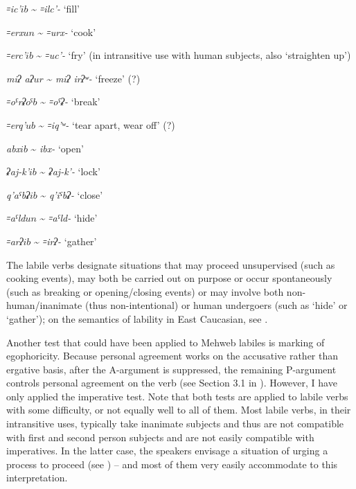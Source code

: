 \documentclass[output=paper]{langsci/langscibook}
\begin{document}
\ea %
\emph{꞊ic'\(ib\)} \textasciitilde{} \emph{꞊ilc'-} `fill'

\ex %
\emph{꞊erx\(un\)} \textasciitilde{} \emph{꞊urx-} `cook'

\ex %
\emph{꞊erc'\(ib\)} \textasciitilde{} \emph{꞊uc'-} `fry' (in
intransitive use with human subjects, also `straighten up')

\ex %
\emph{miʔ aʔ\(ur\)} \textasciitilde{} \emph{miʔ irʔʷ-}
`freeze' (?)

\ex %
\emph{꞊oˤrʡ\(oˤb\)} \textasciitilde{} \emph{꞊oˤʡ-} `break'

\ex %
\emph{꞊erq'\(ub\)} \textasciitilde{} \emph{꞊iq'ʷ-} `tear
apart, wear off' (?)

\ex %
\emph{abx\(ib\)} \textasciitilde{} \emph{ibx-} `open'

\ex %
\emph{ʡaj-k'\(ib\)} \textasciitilde{} \emph{ʡaj-k'-} `lock'

\ex %
\emph{q'aˤbʡ\(ib\)} \textasciitilde{} \emph{q'iˤbʡ-} `close'

\ex %
\emph{꞊aˤld\(un\)} \textasciitilde{} \emph{꞊aˤld-} `hide'

\ex %
\emph{꞊arʔ\(ib\)} \textasciitilde{} \emph{꞊irʔ-} `gather'
\z

The labile verbs designate situations that may proceed unsupervised (such as
cooking events), may both be carried out on purpose or occur
spontaneously (such as breaking or opening/closing events) or may involve both
non-human/inanimate (thus non-intentional) or human undergoers (such as
`hide' or `gather'); on the semantics of lability in East Caucasian, see
\citet{haspelmath1993,daniel-maisak-merdanova2012}.

Another test that could have been applied to Mehweb labiles is marking of egophoricity.
 Because personal agreement works on the accusative rather than ergative basis, after the A-argument is suppressed, the remaining P-argument controls personal agreement on the verb (see Section 3.1 in \citealt{ganenkov2019}).
%
However, I have only applied the imperative test. Note that both tests
are applied to labile verbs with some difficulty, or not equally well to
all of them. Most labile verbs, in their intransitive uses, typically
take inanimate subjects and thus are not compatible with first and
second person subjects and are not easily compatible with imperatives.
In the latter case, the speakers envisage a situation of urging a
process to proceed (see \citealt{dobrushina2019}) – and most of them very easily
accommodate to this interpretation.
\end{document}
